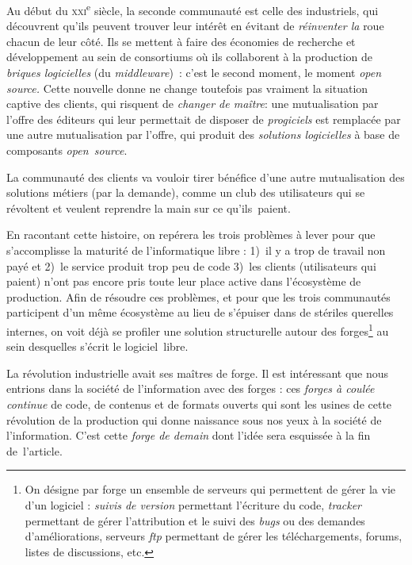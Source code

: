 \documentclass{FramateX}
\begin{document}
\begin{refsection}
Au début du \textsc{xxi}\textsuperscript{e} siècle, la seconde
communauté est celle des industriels, qui découvrent qu'ils peuvent
trouver leur intérêt en évitant de \textit{réinventer la }roue chacun
de leur côté. Ils se mettent à faire des économies de recherche et
développement au sein de consortiums où ils collaborent à la production
de \textit{briques logicielles} (du \textit{middleware})\textit{~}:
c'est le second moment, le moment \textit{open source.} Cette nouvelle
donne ne change toutefois pas vraiment la situation captive des
clients, qui risquent de \textit{changer de maître}: une mutualisation
par l'offre des éditeurs qui leur permettait de disposer de
\textit{progiciels} est remplacée par une autre mutualisation par
l'offre, qui produit des \textit{solutions logicielles} à base de
composants \textit{open~source}. 

La communauté des clients va vouloir tirer bénéfice d'une autre
mutualisation des solutions métiers (par la demande), comme un club des
utilisateurs qui se révoltent et veulent reprendre la main sur ce
qu'ils~paient. 

En racontant cette histoire, on repérera les trois problèmes à lever
pour que s'accomplisse la maturité de l'informatique libre : 1)~il y a
trop de travail non payé et 2)~le service produit trop peu de code
3)~les clients (utilisateurs qui paient) n'ont pas encore pris toute
leur place active dans l'écosystème de production. Afin de résoudre ces
problèmes, et pour que les trois communautés participent d'un même
écosystème au lieu de s'épuiser dans de stériles querelles internes, on
voit déjà se profiler une solution structurelle autour des
forges\footnote{On désigne par forge un ensemble de serveurs qui
permettent de gérer la vie d'un logiciel : \textit{suivis de version}
permettant l'écriture du code, \textit{tracker} permettant de gérer
l'attribution et le suivi des \textit{bugs} ou des demandes
d'améliorations, serveurs \textit{ftp} permettant de gérer les
téléchargements, forums, listes de discussions, etc.} au sein
desquelles s'écrit le logiciel~libre. 

La révolution industrielle avait ses maîtres de forge. Il est
intéressant que nous entrions dans la société de l'information avec des
forges : ces \textit{forges à coulée continue }de code, de contenus et
de formats ouverts qui sont les usines de cette révolution de la
production qui donne naissance sous nos yeux à la société de
l'information. C'est cette \textit{forge de demain} dont l'idée sera
esquissée à la fin de~l'article.


\end{refsection}
\end{document}

